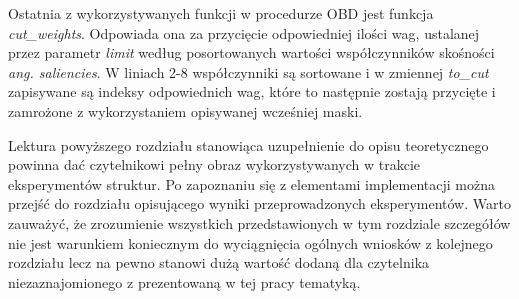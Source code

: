 \par Ostatnia z wykorzystywanych funkcji w procedurze OBD jest funkcja \emph{cut{\_}weights}. Odpowiada ona za przycięcie odpowiedniej ilości wag, ustalanej przez parametr \emph{limit} według posortowanych wartości współczynników skośności \emph{ang. saliencies}. W liniach 2-8 współczynniki są sortowane i w zmiennej \emph{to{\_}cut} zapisywane są indeksy odpowiednich wag, które to następnie zostają przycięte i zamrożone z wykorzystaniem opisywanej wcześniej maski.
\par Lektura powyższego rozdziału stanowiąca uzupełnienie do opisu teoretycznego powinna dać czytelnikowi pełny obraz wykorzystywanych w trakcie eksperymentów struktur. Po zapoznaniu się z elementami implementacji można przejść do rozdziału opisującego wyniki przeprowadzonych eksperymentów. Warto zauważyć, że zrozumienie wszystkich przedstawionych w tym rozdziale szczegółów nie jest warunkiem koniecznym do wyciągnięcia ogólnych wniosków z kolejnego rozdziału lecz na pewno stanowi dużą wartość dodaną dla czytelnika niezaznajomionego z prezentowaną w tej pracy tematyką. 